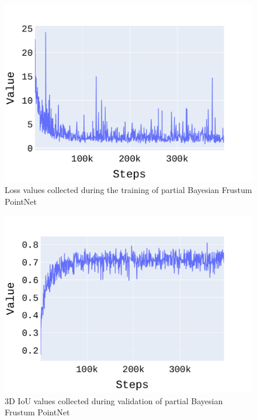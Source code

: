 \documentclass[10pt,twocolumn,letterpaper]{article}
\begin{document}
\begin{figure}[!htbp]
	\centering
	\includegraphics[scale = 0.4]{./images/Part-Bayesian F_Pointnet_Results/loss.pdf}
	\caption{Loss values collected during the training of partial Bayesian Frustum PointNet}
	\label{fig:loss_PBF-PointNet}
\end{figure}

\begin{figure}[!htbp]
	\centering
	\includegraphics[scale = 0.4]{./images/Part-Bayesian F_Pointnet_Results/iou_3d.pdf}
	\caption{3D IoU values collected during validation of partial Bayesian Frustum PointNet}
	\label{fig:IoU_PBF-PointNet}
\end{figure}
\end{document}
